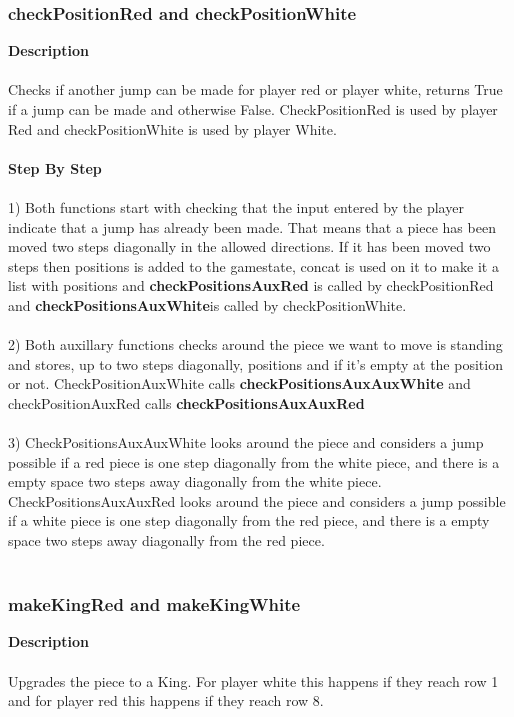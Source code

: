 \documentclass[12pt,a4paper]{article}
\begin{document}
{\subsubsection{checkPositionRed and checkPositionWhite}}
\textbf{Description}\\\\
Checks if another jump can be made for player red or player white, returns True if a jump can be made and otherwise False. CheckPositionRed is used by player Red and checkPositionWhite is used by player White. \\\\
\textbf{Step By Step}\\\\
1) Both functions start with checking that the input entered by the player indicate that a jump has already been made. That means that a piece has been moved two steps diagonally in the allowed directions. If it has been moved two steps then positions is added to the gamestate, concat is used on it to make it a list with positions and {\textbf{\small{checkPositionsAuxRed}}} is called by checkPositionRed and {\textbf{\small{checkPositionsAuxWhite}}}is called by checkPositionWhite. \\\\
2) Both auxillary functions checks around the piece we want to move is standing and stores, up to two steps diagonally, positions and if it's empty at the position or not. CheckPositionAuxWhite calls {\textbf{\small{checkPositionsAuxAuxWhite}}}
and checkPositionAuxRed calls {\textbf{\small{checkPositionsAuxAuxRed}}}\\\\
3) CheckPositionsAuxAuxWhite looks around the piece and considers a jump possible if a red piece is one step diagonally from the white piece, and there is a empty space two steps away diagonally from the white piece.\\
CheckPositionsAuxAuxRed looks around the piece and considers a jump possible if a white piece is one step diagonally from the red piece, and there is a empty space two steps away diagonally from the red piece.
\\\\
{\subsubsection {makeKingRed and makeKingWhite}}
\textbf{Description}\\\\
Upgrades the piece to a King. For player white this happens if they reach row 1 and for player red this happens if they reach row 8.\\\\
\end{document}
